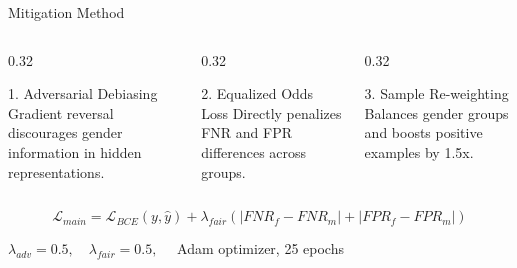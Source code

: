 \documentclass[10pt,aspectratio=169]{beamer}
\begin{document}
\begin{frame}{Mitigation Method}
  \begin{columns}[T,onlytextwidth]
    \begin{column}{0.32\textwidth}
      \begin{block}{1. Adversarial Debiasing}
        Gradient reversal discourages gender information in hidden representations.
      \end{block}
    \end{column}
    \begin{column}{0.32\textwidth}
      \begin{block}{2. Equalized Odds Loss}
        Directly penalizes FNR and FPR differences across groups.
      \end{block}
    \end{column}
    \begin{column}{0.32\textwidth}
      \begin{block}{3. Sample Re-weighting}
        Balances gender groups and boosts positive examples by 1.5x.
      \end{block}
    \end{column}
  \end{columns}

  \vspace{1.0em}
  \begin{equation*}
    \mathcal{L}_{main} = \mathcal{L}_{BCE}(y,\hat{y})
    + \lambda_{fair}\left(|FNR_f-FNR_m| + |FPR_f-FPR_m|\right)
  \end{equation*}
  \vspace{-0.4em}
  \begin{center}
    $\lambda_{adv}=0.5,\quad \lambda_{fair}=0.5,\quad$ Adam optimizer, 25 epochs
  \end{center}
\end{frame}
\end{document}

